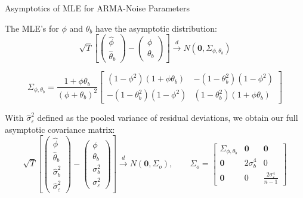 \documentclass[9pt]{beamer}
\numberwithin{equation}{section}
\theoremstyle{plain}
\begin{document}
\begin{frame}{Asymptotics of MLE for ARMA-Noise Parameters}

\begin{block}{The MLE's for $\phi$ and $\theta_b$ have the asymptotic distribution:}
\centering
    $$ \sqrt{T}\left[\left(\begin{array}{c}
     \hat{\phi}  \\
      \hat{\theta}_b
\end{array}\right)-\left(\begin{array}{c}
     \phi  \\
     \theta_b
\end{array}\right)\right] \xrightarrow{d} N(\mathbf{0},\Sigma_{\phi,\theta_b})$$
\end{block}
\begin{block}{}
\centering

$$
\Sigma_{\phi,\theta_b} = \frac{1 + \phi\theta_b}{(\phi + \theta_b)^{2}} \left[ \begin{array}{cc}
    {(1 - \phi^2)(1 + \phi\theta_b)} & {-(1 - \theta_b^2)(1 - \phi^2)} \\
    {-(1 - \theta_b^2)(1 - \phi^2)} & {(1 - \theta_b^2)(1 + \phi\theta_b)}  
\end{array} \right] 
$$
\end{block}

    \begin{block}{With $\hat{\sigma}_\varepsilon^2$ defined as the pooled variance of residual deviations, we obtain our full asymptotic covariance matrix:}
        \centering
        $$\sqrt{T}\left[\left(\begin{array}{c}
     \hat{\phi}  \\
     \hat{\theta}_b \\
     \hat{\sigma}_b^2  \\
     \hat{\sigma}_\varepsilon^2
\end{array}\right) - \left(\begin{array}{c}
     {\phi}  \\
     {\theta}_b \\
     {\sigma}_b^2\\
     \sigma_\varepsilon^2
\end{array}\right)\right] \xrightarrow{d}N(\mathbf{0}, \Sigma_o), \qquad \Sigma_o = \left[ \begin{array}{ccc}
    \Sigma_{\phi,\theta_b} & \bm{0} & \mathbf{0} \\
    \mathbf{0} & {2\sigma_b^4} & 0 \\
   \mathbf{0}& 0 & \frac{2\sigma_\varepsilon^4}{n-1} 
\end{array} \right] $$
    \end{block}



\end{frame}
\end{document}
